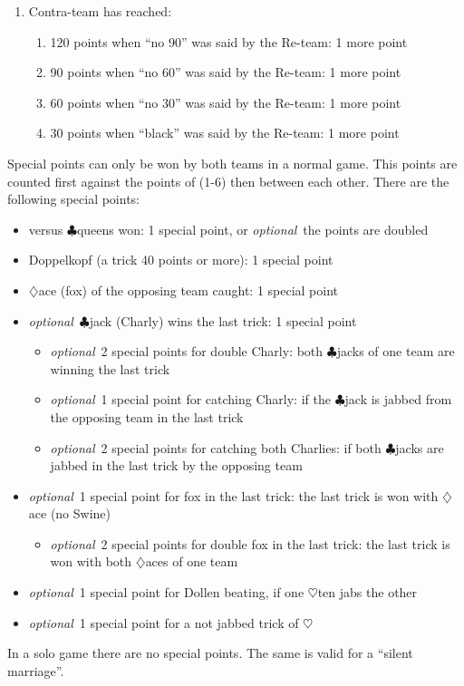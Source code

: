 \documentclass[12pt,a4paper]{article}
\newcommand{\kreuz}{$\clubsuit$}
\newcommand{\herz}{$\heartsuit$}
\newcommand{\karo}{$\diamondsuit$}
\newcommand{\optional}{\textit{optional}}
\begin{document}
\begin{enumerate}
\begin{enumerate}
\end{enumerate}
\item Contra-team has reached:
\begin{enumerate}
\item 120 points when "`no 90"' was said by the Re-team: 1 more point
\item 90 points when "`no 60"' was said by the Re-team: 1 more point
\item 60 points when "`no 30"' was said by the Re-team: 1 more point
\item 30 points when "`black"' was said by the Re-team: 1 more point
\end{enumerate}
\end{enumerate}
Special points can only be won by both teams in a normal game.
This points are counted first against the points of (1-6) then between each other.
There are the following special points:
\begin{itemize}
\item versus \kreuz queens won: 1 special point, or \optional\ the points are doubled
\item Doppelkopf (a trick 40 points or more): 1 special point
\item \karo ace (fox) of the opposing team caught: 1 special point
\item \optional\ \kreuz jack (Charly) wins the last trick: 1 special point
\begin{itemize}
\item \optional\ 2 special points for double Charly: both \kreuz jacks of one team are winning the last trick
\item \optional\ 1 special point for catching Charly: if the \kreuz jack is jabbed from the opposing team in the last trick
\item \optional\ 2 special points for catching both Charlies: if both \kreuz jacks are jabbed in the last trick by the opposing team
\end{itemize}
\item \optional\ 1 special point for fox in the last trick: the last trick is won with \karo ace (no Swine)
\begin{itemize}
\item \optional\ 2 special points for double fox in the last trick: the last trick is won with both \karo aces of one team
\end{itemize}
\item \optional\ 1 special point for Dollen beating, if one \herz ten jabs the other
\item \optional\ 1 special point for a not jabbed trick of \herz
\end{itemize}
In a solo game there  are no special points. The same is valid
for a "`silent marriage"'.
\end{document}
